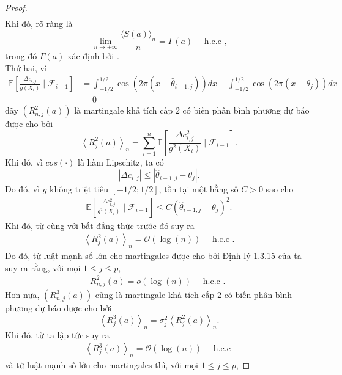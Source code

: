 \begin{proof}
$$\begin{aligned}
\end{aligned}
$$
Khi đó, rõ ràng là
$$
\lim _{n \rightarrow+\infty} \frac{\langle S(a)\rangle_{n}}{n}=\Gamma(a) \quad \text { h.c.c ,}
$$
trong đó $\Gamma(a)$ xác định bởi .\\
Thứ hai, vì
$$
\begin{aligned}
\mathbb{E}\left[\frac{\Delta c_{i, j}}{g\left(X_{i}\right)} \mid \mathcal{F}_{i-1}\right] & =\int_{-1 / 2}^{1 / 2} \cos \left(2 \pi\left(x-\widehat{\theta}_{i-1, j}\right)\right) d x-\int_{-1 / 2}^{1 / 2} \cos \left(2 \pi\left(x-\theta_{j}\right)\right) d x \\
& =0
\end{aligned}
$$
dãy $\left(R_{n, j}^{2}(a)\right)$ là martingale khả tích cấp 2 có biến phân bình phương dự báo được cho bởi
$$
\left\langle R_{j}^{2}(a)\right\rangle_{n}=\sum_{i=1}^{n} \mathbb{E}\left[\frac{\Delta c_{i, j}^{2}}{g^{2}\left(X_{i}\right)} \mid \mathcal{F}_{i-1}\right].
$$
Khi đó, vì $cos\left(\cdot\right)$ là hàm Lipschitz, ta có
$$
\left|\Delta c_{i, j}\right| \leq\left|\widehat{\theta}_{i-1, j}-\theta_{j}\right|.
$$
Do đó, vì $g$ không triệt tiêu $[-1 / 2 ; 1 / 2]$, tồn tại một hằng số  $C>0$ sao cho
\begin{align}
    \mathbb{E}\left[\frac{\Delta c_{i, j}^{2}}{g^{2}\left(X_{i}\right)} \mid \mathcal{F}_{i-1}\right] \leq C\left(\widehat{\theta}_{i-1, j}-\theta_{j}\right)^{2}.
    \label{8.17}
\end{align}
Khi đó, từ  cùng với bất đẳng thức trước đó  suy ra
\begin{align}
    \left\langle R_{j}^{2}(a)\right\rangle_{n}=\mathcal{O}(\log (n)) \quad \text { h.c.c .}
    \label{8.18}
\end{align}
Do đó, từ luật mạnh số lớn cho martingales được cho bởi Định lý 1.3.15 của \cite{duflo} ta suy ra rằng, với mọi $1 \leq j \leq p$,
\begin{align}
    R_{n, j}^{2}(a)=o(\log (n)) \quad \text { h.c.c . }
    \label{8.19}
\end{align}
Hơn nữa, $\left(R_{n, j}^{3}(a)\right)$ cũng là martingale khả tích cấp 2 có biến phân bình phương dự báo được cho bởi
$$
\left\langle R_{j}^{3}(a)\right\rangle_{n}=\sigma_{j}^{2}\left\langle R_{j}^{2}(a)\right\rangle_{n}.
$$
Khi đó, từ  ta lập tức suy ra
\begin{align}
    \left\langle R_{j}^{3}(a)\right\rangle_{n}=\mathcal{O}(\log (n)) \quad \text { h.c.c }
    \label{8.20}
\end{align}
và từ luật mạnh số lớn cho martingales thì, với mọi $1 \leq j \leq p$,

\end{proof}
